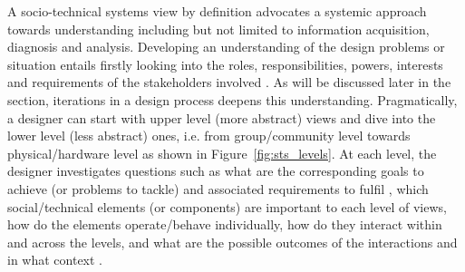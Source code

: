 A socio-technical systems view by definition advocates a systemic approach towards understanding including but not limited to information acquisition, diagnosis and analysis. Developing an understanding of the design problems or situation entails firstly looking into the roles, responsibilities, powers, interests and requirements of the stakeholders involved \cite{Checkland1981}. As will be discussed later in the section, iterations in a design process deepens this understanding. 
Pragmatically, a designer can start with upper level (more abstract) views and dive into the lower level (less abstract) ones, i.e. from group/community level towards physical/hardware level as shown in Figure~\ref{fig:sts_levels}.
At each level, the designer investigates questions such as what are the corresponding goals to achieve (or problems to tackle) \cite{Checkland1981,Waterson2002} and associated requirements to fulfil \cite{Whitworth2009a}, which social/technical elements (or components) are important to each level of views, how do the elements operate/behave individually, how do they interact within and across the levels, and what are the possible outcomes of the interactions and in what context \cite{Baxter2011}. 

